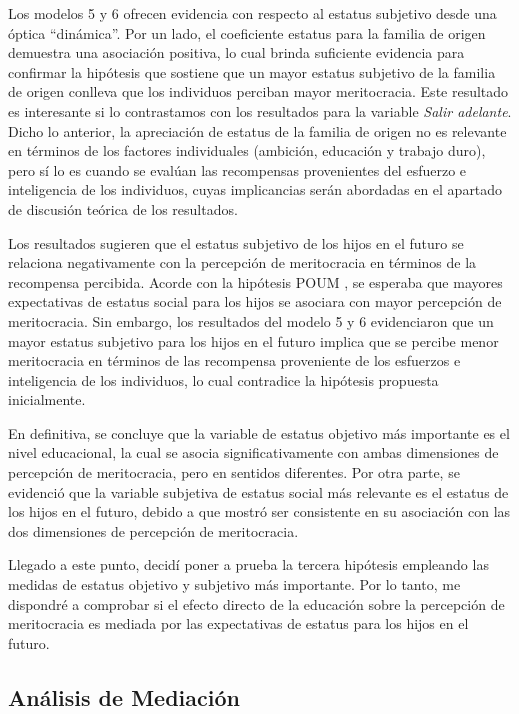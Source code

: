 \documentclass[12pt]{article}
\begin{document}
Los modelos 5 y 6 ofrecen evidencia con respecto al estatus subjetivo desde una óptica ``dinámica''. Por un lado, el coeficiente estatus para la familia de origen demuestra una asociación positiva, lo cual brinda suficiente evidencia para confirmar la hipótesis que sostiene que un mayor estatus subjetivo de la familia de origen conlleva que los individuos perciban mayor meritocracia. Este resultado es interesante si lo contrastamos con los resultados para la variable \textit{Salir adelante}. Dicho lo anterior, la apreciación de estatus de la familia de origen no es relevante en términos de los factores individuales (ambición, educación y trabajo duro), pero sí lo es cuando se evalúan las recompensas provenientes del esfuerzo e inteligencia de los individuos, cuyas implicancias serán abordadas en el apartado de discusión teórica de los resultados.

Los resultados sugieren que el estatus subjetivo de los hijos en el futuro se relaciona negativamente con la percepción de meritocracia en términos de la recompensa percibida. Acorde con la hipótesis POUM \citep{Benabou2001}, se esperaba que mayores expectativas de estatus social para los hijos se asociara con mayor percepción de meritocracia. Sin embargo, los resultados del modelo 5 y 6 evidenciaron que un mayor estatus subjetivo para los hijos en el futuro implica que se percibe menor meritocracia en términos de las recompensa proveniente de los esfuerzos e inteligencia de los individuos, lo cual contradice la hipótesis propuesta inicialmente. 

En definitiva, se concluye que la variable de estatus objetivo más importante es el nivel educacional, la cual se asocia significativamente con ambas dimensiones de percepción de meritocracia, pero en sentidos diferentes. Por otra parte, se evidenció que la variable subjetiva de estatus social más relevante es el estatus de los hijos en el futuro, debido a que mostró ser consistente en su asociación con las dos dimensiones de percepción de meritocracia. 

Llegado a este punto, decidí poner a prueba la tercera hipótesis empleando las medidas de estatus objetivo y subjetivo más importante. Por lo tanto, me dispondré a comprobar si el efecto directo de la educación sobre la percepción de meritocracia es mediada por las expectativas de estatus para los hijos en el futuro.     

\subsection[Análisis de Mediación]{Análisis de Mediación}
\end{document}
